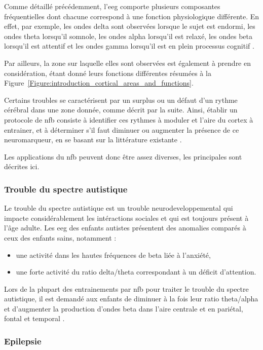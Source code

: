 Comme détaillé précédemment, l'\gls{eeg} comporte plusieurs composantes fréquentielles dont chacune correspond à une fonction physiologique différente.
En effet, par exemple, les ondes delta sont observées lorsque le sujet est endormi, les ondes theta lorsqu'il somnole, les ondes alpha lorsqu'il est relaxé, 
les ondes beta lorsqu'il est attentif et les ondes gamma lorsqu'il est en plein processus cognitif \citep{Marzbani2016}. 

Par ailleurs, la zone sur laquelle elles sont observées est également à prendre en considération, étant donné leurs fonctions différentes résumées
à la Figure~\ref{Figure:introduction_cortical_areas_and_functions}.

Certains troubles se caractérisent par un surplus ou un défaut d'un rythme cérébral dans une zone donnée, comme décrit par la suite. 
Ainsi, établir un protocole de \gls{nfb} consiste à identifier ces rythmes à moduler et l'aire 
du cortex à entrainer, et à déterminer s'il faut diminuer ou augmenter la présence de ce neuromarqueur, en se basant sur la littérature 
existante \citep{Micoulaud2019}.

Les applications du \gls{nfb} peuvent donc être assez diverses, les principales sont décrites ici. 

\subsubsection{Trouble du spectre autistique}

Le trouble du spectre autistique est un trouble neurodeveloppemental qui impacte considérablement les intéractions sociales et qui est toujours présent à 
l'âge adulte. Les \gls{eeg} des enfants autistes présentent des anomalies comparés à ceux des enfants sains, notamment \citep{Coben2010, Kouijzer2010} :
\begin{itemize}
\item une activité dans les hautes fréquences de beta liée à l'anxiété,
\item une forte activité du ratio delta/theta correspondant à un déficit d'attention.
\end{itemize}
Lors de la plupart des entrainements par \gls{nfb} pour traiter le trouble du spectre autistique, il est demandé aux enfants de diminuer à la fois leur ratio 
theta/alpha et d'augmenter la production d'ondes beta dans l'aire centrale \citep{Thompson2010} et en pariétal, fontal et temporal \citep{Othmer2007}. 

\subsubsection{Epilepsie}

